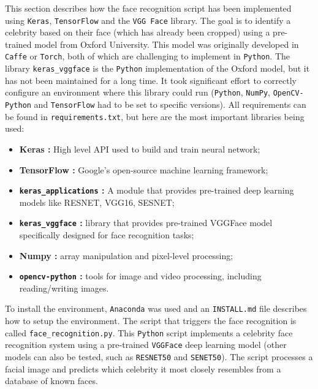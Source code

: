 \documentclass[a4paper,12pt]{article}
\begin{document}
This section describes how the face recognition script has been implemented using \texttt{Keras}, \texttt{TensorFlow} and the \texttt{VGG Face} library. The goal is to identify a celebrity based on their face (which has already been cropped) using a pre-trained model from Oxford University. This model was originally developed in \texttt{Caffe} or \texttt{Torch}, both of which are challenging to implement in \texttt{Python}. The library \texttt{keras\_vggface} is the \texttt{Python} implementation of the Oxford model, but it has not been maintained for a long time. It took significant effort to correctly configure an environment where this library could run (\texttt{Python}, \texttt{NumPy}, \texttt{OpenCV-Python} and \texttt{TensorFlow} had to be set to specific versions). All requirements can be found in \texttt{requirements.txt}, but here are the most important libraries being used:
\begin{itemize}
    \item \textbf{Keras :} High level API used to build and train neural network;
    \item\textbf{TensorFlow :} Google's open-source machine learning framework;
    \item\textbf{\texttt{keras\_applications} :} A module that provides pre-trained deep learning models like RESNET, VGG16, SESNET;
    \item \textbf{\texttt{keras\_vggface} :} library that provides pre-trained VGGFace model specifically designed for face recognition tasks;
    \item \textbf{Numpy :} array manipulation and pixel-level processing;
    \item \textbf{\texttt{opencv-python} :} tools for image and video processing, including reading/writing images.
\end{itemize}
To install the environment, \texttt{Anaconda} was used and an \texttt{INSTALL.md} file describes how to setup the environment. The script that triggers the face recognition is called \texttt{face\_recognition.py}. This \texttt{Python} script implements a celebrity face recognition system using a pre-trained \texttt{VGGFace} deep learning model (other models can also be tested, such as \texttt{RESNET50} and \texttt{SENET50}). The script processes a facial image and predicts which celebrity it most closely resembles from a database of known faces.
\end{document}
